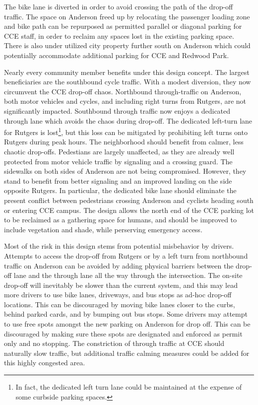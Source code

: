 \documentclass[12pt]{article}
\begin{document}
The bike lane is diverted in order to avoid crossing the path of the
drop-off traffic.  The space on Anderson freed up by relocating the
passenger loading zone and bike path can be repurposed as permitted
parallel or diagonal parking for CCE staff, in order to reclaim any
spaces lost in the existing parking space.  There is also under
utilized city property further south on Anderson which could
potentially accommodate additional parking for CCE and Redwood Park.

Nearly every community member benefits under this design concept.  The
largest beneficiaries are the southbound cycle traffic.  With a modest
diversion, they now circumvent the CCE drop-off chaos.  Northbound
through-traffic on Anderson, both motor vehicles and cycles, and
including right turns from Rutgers, are not significantly impacted.
Southbound through traffic now enjoys a dedicated through lane which
avoids the chaos during drop-off.  The dedicated left-turn lane for
Rutgers is lost\footnote{In fact, the dedicated left turn lane could
be maintained at the expense of some curbside parking spaces.}, but
this loss can be mitigated by prohibiting left turns onto Rutgers
during peak hours.  The neighborhood should benefit from calmer, less
chaotic drop-offs.  Pedestians are largely unaffected, as they are
already well protected from motor vehicle traffic by signaling and a
crossing guard.  The sidewalks on both sides of Anderson are not being
compromised.  However, they stand to benefit from better signaling and
an improved landing on the side opposite Rutgers.  In particular, the
dedicated bike lane should eliminate the present conflict between
pedestrians crossing Anderson and cyclists heading south or entering
CCE campus.  The design allows the north end of the CCE parking lot to
be reclaimed as a gathering space for humans, and should be improved
to include vegetation and shade, while perserving emergency access.

Most of the risk in this design stems from potential misbehavior by
drivers.  Attempts to access the drop-off from Rutgers or by a left
turn from northbound traffic on Anderson can be avoided by adding
physical barriers between the drop-off lane and the through lane all
the way through the intersection.  The on-site drop-off will
inevitably be slower than the current system, and this may lead more
drivers to use bike lanes, driveways, and bus stops as ad-hoc drop-off
locations.  This can be discouraged by moving bike lanes closer to the
curbs, behind parked cards, and by bumping out bus stops.  Some
drivers may attempt to use free spots amongst the new parking on
Anderson for drop off. This can be discouraged by making sure these
spots are designated and enforced as permit only and no stopping.  The
constriction of through traffic at CCE should naturally slow traffic,
but additional traffic calming measures could be added for this
highly congested area.
\end{document}
